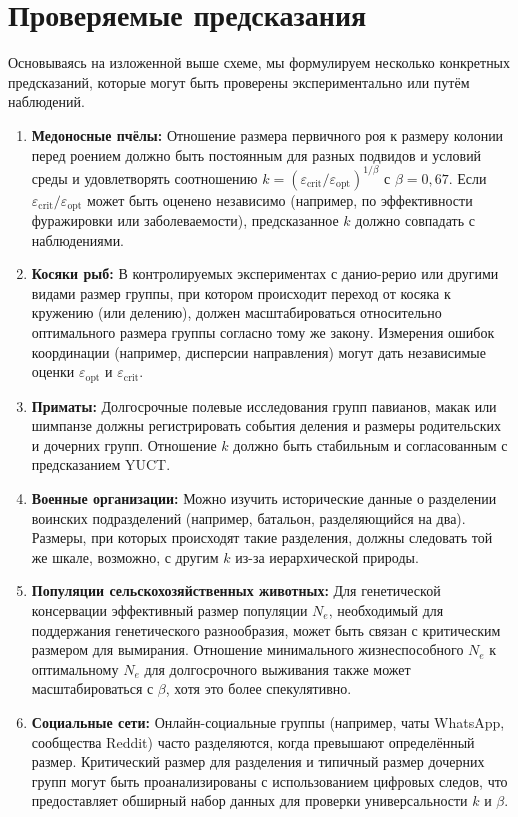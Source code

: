 \documentclass[12pt]{article}
\theoremstyle{remark}
\begin{document}
	\section{Проверяемые предсказания}
	\label{sec:predictions}
	
	Основываясь на изложенной выше схеме, мы формулируем несколько конкретных предсказаний, которые могут быть проверены экспериментально или путём наблюдений.
	
	\begin{enumerate}
		\item \textbf{Медоносные пчёлы:} Отношение размера первичного роя к размеру колонии перед роением должно быть постоянным для разных подвидов и условий среды и удовлетворять соотношению $k = (\varepsilon_{\text{crit}}/\varepsilon_{\text{opt}})^{1/\beta}$ с $\beta = 0,67$. Если $\varepsilon_{\text{crit}}/\varepsilon_{\text{opt}}$ может быть оценено независимо (например, по эффективности фуражировки или заболеваемости), предсказанное $k$ должно совпадать с наблюдениями.
		
		\item \textbf{Косяки рыб:} В контролируемых экспериментах с данио-рерио или другими видами размер группы, при котором происходит переход от косяка к кружению (или делению), должен масштабироваться относительно оптимального размера группы согласно тому же закону. Измерения ошибок координации (например, дисперсии направления) могут дать независимые оценки $\varepsilon_{\text{opt}}$ и $\varepsilon_{\text{crit}}$.
		
		\item \textbf{Приматы:} Долгосрочные полевые исследования групп павианов, макак или шимпанзе должны регистрировать события деления и размеры родительских и дочерних групп. Отношение $k$ должно быть стабильным и согласованным с предсказанием YUCT.
		
		\item \textbf{Военные организации:} Можно изучить исторические данные о разделении воинских подразделений (например, батальон, разделяющийся на два). Размеры, при которых происходят такие разделения, должны следовать той же шкале, возможно, с другим $k$ из-за иерархической природы.
		
		\item \textbf{Популяции сельскохозяйственных животных:} Для генетической консервации эффективный размер популяции $N_e$, необходимый для поддержания генетического разнообразия, может быть связан с критическим размером для вымирания. Отношение минимального жизнеспособного $N_e$ к оптимальному $N_e$ для долгосрочного выживания также может масштабироваться с $\beta$, хотя это более спекулятивно.
		
		\item \textbf{Социальные сети:} Онлайн-социальные группы (например, чаты WhatsApp, сообщества Reddit) часто разделяются, когда превышают определённый размер. Критический размер для разделения и типичный размер дочерних групп могут быть проанализированы с использованием цифровых следов, что предоставляет обширный набор данных для проверки универсальности $k$ и $\beta$.
	\end{enumerate}
	
\end{document}
